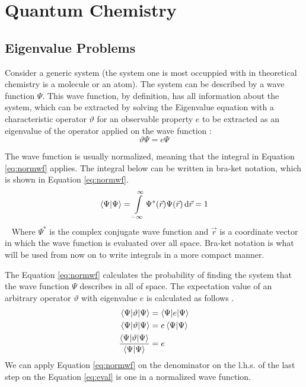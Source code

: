 \documentclass[../master_thesis.tex]{subfiles}
\begin{document}
\chapter{Quantum Chemistry}
\section{Eigenvalue Problems}
Consider a generic system (the system one is most occuppied with in theoretical
chemistry is a molecule or an atom). The system can be described by a
wave function $\Psi$. This wave function, by definition, has all information
about the system, which can be extracted by solving the Eigenvalue equation
with a characteristic operator $\vartheta$ for an observable property $ e $ to
be extracted as an eigenvalue of the operator applied on the wave function
\cite{Cramer:2004}:
\begin{equation}
  \vartheta\Psi = e\Psi\label{eq:eigenequation}
\end{equation}

The wave function is usually normalized, meaning that the integral in Equation
\ref{eq:normwf} applies. The integral below can be written in bra-ket
\cite{Jensen:2017} notation, which is shown in Equation \ref{eq:normwf}.
\begin{equation}
  \braket{\Psi|\Psi} = \int\limits_{-\infty}^{\infty}
  \Psi^*(\vec{r})\Psi(\vec{r})\mathrm{\,d}\vec{r} = 1\label{eq:normwf}
\end{equation} 
Where $\Psi^*$ is the complex conjugate wave function and $\vec{r}$ is a
coordinate vector in which the wave function is evaluated over all space.
Bra-ket notation is what will be used from now on to write integrals in a more
compact manner.

The Equation \ref{eq:normwf} calculates the probability of finding the system
that the wave function $\Psi$ describes in all of space. The expectation value
of an arbitrary operator $\vartheta$ with eigenvalue $e$ is calculated as
follows \cite{Atkins:2014}.
\begin{align}
  \begin{split}
    \braket{\Psi|\vartheta|\Psi} &= \braket{\Psi|e|\Psi} \\
    \braket{\Psi|\vartheta|\Psi}&= e\braket{\Psi|\Psi} \\
    \frac{\braket{\Psi|\vartheta|\Psi}}{\braket{\Psi|\Psi}}&= e\label{eq:eval}
  \end{split}
\end{align}
We can apply Equation \ref{eq:normwf} on the denominator on the l.h.s. of the
last step on the Equation \ref{eq:eval} is one in a normalized wave function.
\end{document}
